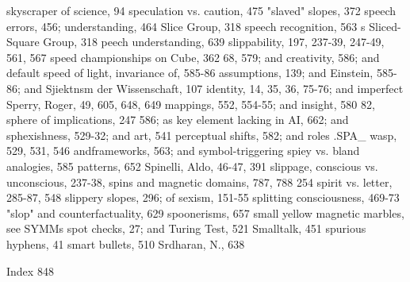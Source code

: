 skyscraper of science, 94                          speculation vs. caution, 475
"slaved" slopes, 372                               speech errors, 456; understanding, 464
Slice Group, 318                                   speech recognition, 563 s
Sliced-Square Group, 318                           peech understanding, 639
slippability, 197, 237-39, 247-49, 561, 567        speed championships on Cube, 362
 68, 579; and creativity, 586; and default         speed of light, invariance of, 585-86
 assumptions, 139; and Einstein, 585-86; and       Sjiektnsm der Wissenschaft, 107
 identity, 14, 35, 36, 75-76; and imperfect        Sperry, Roger, 49, 605, 648, 649
 mappings, 552, 554-55; and insight, 580 82,       sphere of implications, 247
 586; as key element lacking in AI, 662; and       sphexishness, 529-32; and art, 541
 perceptual shifts, 582; and roles                 .SPA\_ wasp, 529, 531, 546
 andframeworks, 563; and symbol-triggering         spiey vs. bland analogies, 585
 patterns, 652                                     Spinelli, Aldo, 46-47, 391
slippage, conscious vs. unconscious, 237-38,       spins and magnetic domains, 787, 788
 254                                               spirit vs. letter, 285-87, 548
slippery slopes, 296; of sexism, 151-55            splitting consciousness, 469-73
"slop" and counterfactuality, 629                  spoonerisms, 657
small yellow magnetic marbles, see SYMMs           spot checks, 27; and Turing Test, 521
Smalltalk, 451                                     spurious hyphens, 41
smart bullets, 510                                 Srdharan, N., 638

 Index                                                                                     848

